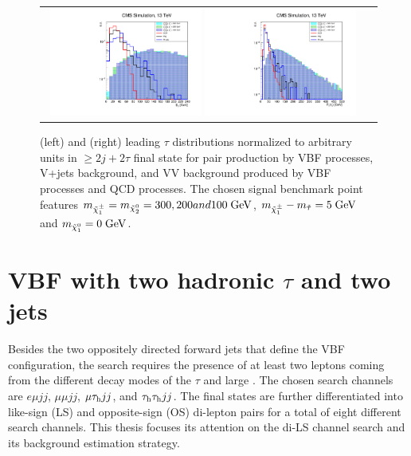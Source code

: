 \begin{figure}[tbh!]
	\centering
	\begin{tabular}{cc}
		\includegraphics[width=0.48\textwidth]{analysis/pics/h_met_prospects13tev.pdf}
		\includegraphics[width=0.48\textwidth]{analysis/pics/h_tau1pt_prospects13tev.pdf} 		
	\end{tabular}
	\caption{(left) \met and (right) leading \ensuremath{\tau} \pt distributions normalized to arbitrary units in \ensuremath{\geq 2j + 2\tau} final state for \charginopm \charginopm pair production by VBF processes, V+jets background, and VV background produced by VBF processes and QCD processes. The chosen signal benchmark point features \ensuremath{m_{\charginopm} = m_{\neutralinotwo} = 300, 200 and 100\gev}, \ensuremath{m_{\charginopm} - m_{\tilde{\tau}} = 5\gev} and \ensuremath{m_{\neutralinoone} = 0\gev}.}
	\label{fig:VBF_met_pttau}
\end{figure}


\section{VBF with two hadronic $\tau$ and two jets}

Besides the two oppositely directed forward jets that define the VBF configuration, the search requires the presence of at least two leptons coming from the different decay modes of the $\tau$ and large \met. The chosen search channels are $e\mu jj$, $\mu\mu jj$, $\mu\tau_{\text{h}} jj$, and $\tau_{\text{h}}\tau_{\text{h}} jj$. The final states are further differentiated into like-sign (LS) and opposite-sign (OS) di-lepton pairs for a total of eight different search channels. This thesis focuses its attention on the di-\hadtau LS channel search and its background estimation strategy. 


